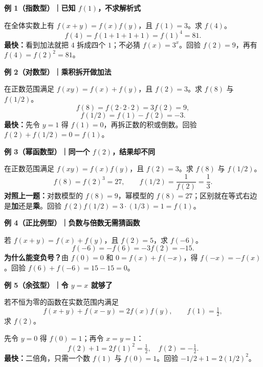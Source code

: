 \FReserve{4cm}
\begin{examplebox}
\textbf{\textcolor{CExample}{例 1（指数型）｜已知 $f(1)$，不求解析式}}

在全体实数上有 $f(x+y)=f(x)f(y)$，且 $f(1)=3$。求 $f(4)$。
\[
f(4)=f(1+1+1+1)=f(1)^4=\boxed{81}.
\]
\textbf{最快：}看到加法就把 $4$ 拆成四个 $1$；不必猜 $f(x)=3^x$。回验 $f(2)=9$，再有 $f(4)=f(2)^2=81$。

\end{examplebox}

\FReserve{4cm}
\begin{examplebox}
\textbf{\textcolor{CExample}{例 2（对数型）｜乘积拆开做加法}}

在正数范围满足 $f(xy)=f(x)+f(y)$，且 $f(2)=3$。求 $f(8)$ 与 $f(1/2)$。
\[
f(8)=f(2\cdot2\cdot2)=3f(2)=\boxed{9},
\]
\[
f(1/2)=f(1)-f(2)=\boxed{-3}.
\]
\textbf{最快：}先令 $y=1$ 得 $f(1)=0$，再拆正数的积或倒数。回验 $f(2) + f(1/2)=0=f(1)$。
\end{examplebox}

\FReserve{4cm}
\begin{examplebox}
\textbf{\textcolor{CExample}{例 3（幂函数型）｜同一个 $f(2)$，结果却不同}}

在正数范围满足 $f(xy)=f(x)f(y)$，且 $f(2)=3$。求 $f(8)$ 与 $f(1/2)$。
\[
f(8)=f(2)^3=\boxed{27},\qquad
f(1/2)=\frac1{f(2)}=\boxed{\frac13}.
\]
\textbf{对照上一题：}对数模型的 $f(8)=9$，幂模型的 $f(8)=27$；区别就在等式右边是\textbf{加}还是\textbf{乘}。回验 $f(2)f(1/2)=3\cdot(1/3)=1=f(1)$。
\end{examplebox}

\FReserve{4cm}
\begin{examplebox}
\textbf{\textcolor{CExample}{例 4（正比例型）｜负数与倍数无需猜函数}}

若 $f(x+y)=f(x)+f(y)$，且 $f(2)=5$，求 $f(-6)$。
\[
f(-6)=-f(6)=-3f(2)=\boxed{-15}.
\]
\textbf{为什么能变负号？}由 $f(0)=0$ 和 $0=f(x)+f(-x)$，得 $f(-x)=-f(x)$。回验 $f(6)+f(-6)=15-15=0$。
\end{examplebox}

\FReserve{4cm}
\begin{examplebox}
\textbf{\textcolor{CExample}{例 5（余弦型）｜令 $y=x$ 就够了}}

若不恒为零的函数在实数范围内满足
\[f(x+y)+f(x-y)=2f(x)f(y),\qquad f(1)=\tfrac12,\]
求 $f(2)$。

先令 $y=0$ 得 $f(0)=1$；再令 $x=y=1$：
\[
f(2)+1=2f(1)^2=\tfrac12,\quad\boxed{f(2)=-\tfrac12}.
\]
\textbf{最快：}二倍角，只需一个数 $f(1)$ 与 $f(0)=1$。回验 $-1/2+1=2(1/2)^2$。

\end{examplebox}

